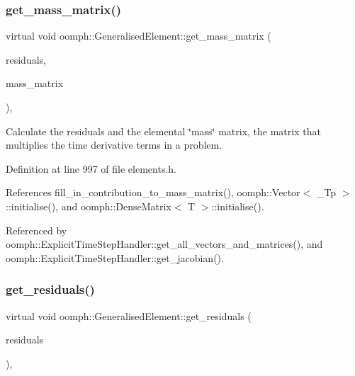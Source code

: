 \subsubsection{\texorpdfstring{get\+\_\+mass\+\_\+matrix()}{get\_mass\_matrix()}}
{\footnotesize\ttfamily virtual void oomph\+::\+Generalised\+Element\+::get\+\_\+mass\+\_\+matrix (\begin{DoxyParamCaption}\item[{\hyperlink{classoomph_1_1Vector}{Vector}$<$ double $>$ \&}]{residuals,  }\item[{\hyperlink{classoomph_1_1DenseMatrix}{Dense\+Matrix}$<$ double $>$ \&}]{mass\+\_\+matrix }\end{DoxyParamCaption})\hspace{0.3cm}{\ttfamily [inline]}, {\ttfamily [virtual]}}



Calculate the residuals and the elemental \char`\"{}mass\char`\"{} matrix, the matrix that multiplies the time derivative terms in a problem. 



Definition at line 997 of file elements.\+h.



References fill\+\_\+in\+\_\+contribution\+\_\+to\+\_\+mass\+\_\+matrix(), oomph\+::\+Vector$<$ \+\_\+\+Tp $>$\+::initialise(), and oomph\+::\+Dense\+Matrix$<$ T $>$\+::initialise().



Referenced by oomph\+::\+Explicit\+Time\+Step\+Handler\+::get\+\_\+all\+\_\+vectors\+\_\+and\+\_\+matrices(), and oomph\+::\+Explicit\+Time\+Step\+Handler\+::get\+\_\+jacobian().

\mbox{\label{classoomph_1_1GeneralisedElement_a53d348ab71c86b53619129a1dd411d30}} 
\subsubsection{\texorpdfstring{get\+\_\+residuals()}{get\_residuals()}}
{\footnotesize\ttfamily virtual void oomph\+::\+Generalised\+Element\+::get\+\_\+residuals (\begin{DoxyParamCaption}\item[{\hyperlink{classoomph_1_1Vector}{Vector}$<$ double $>$ \&}]{residuals }\end{DoxyParamCaption})\hspace{0.3cm}{\ttfamily [inline]}, {\ttfamily [virtual]}}



